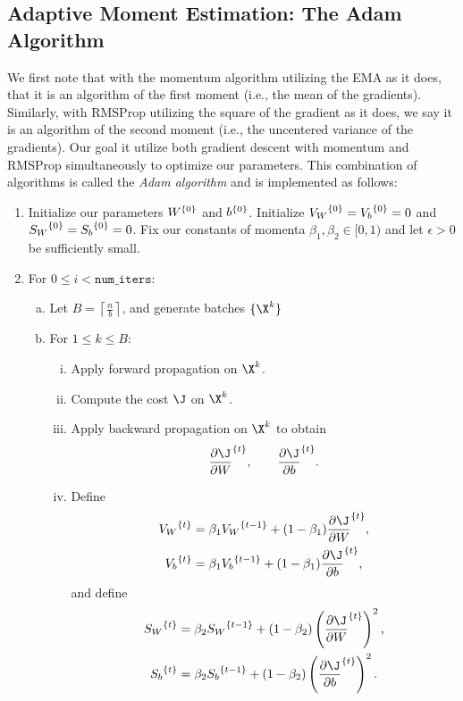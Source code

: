 \subsection{Adaptive Moment Estimation: The Adam Algorithm}

We first note that with the momentum algorithm utilizing the EMA as it does, that it is an algorithm of the first moment (i.e., the mean of the gradients).  Similarly, with RMSProp utilizing the square of the gradient as it does, we say it is an algorithm of the second moment (i.e., the uncentered variance of the gradients).  Our goal it utilize both gradient descent with momentum and RMSProp simultaneously to optimize our parameters.  This combination of algorithms is called the \textit{Adam algorithm} and is implemented as follows:
\begin{enumerate}
	\item Initialize our parameters ${W}^{\{{0}\}}$ and ${b}^{\{{0}\}}$.  Initialize ${V_W}^{\{{0}\}}={V_b}^{\{{0}\}}=0$ and ${S_W}^{\{{0}\}}={S_b}^{\{{0}\}}=0$.  Fix our constants of momenta $\beta_1,\beta_2\in[0,1)$ and let $\epsilon>0$ be sufficiently small.
	\item For $0\leq i <\texttt{num\_iters}$:
	\begin{enumerate}[a.]
		\item Let $B=\left\lceil\frac{n}{b}\right\rceil$, and generate batches $\{\X^k\}$
		\item For $1\leq k\leq B$:
		\begin{enumerate}[i.]
			\item Apply forward propagation on $\X^k$.
			\item Compute the cost $\J$ on $\X^k$.
			\item Apply backward propagation on $\X^k$ to obtain
			$$\iter{\frac{\partial\J}{\partial W}}{t},\qquad \iter{\frac{\partial\J}{\partial b}}{t}.$$
			\item Define
			\begin{align*}
				\iter{V_W}{t}&=\beta_1\iter{V_W}{t-1}+(1-\beta_1)\iter{\frac{\partial\J}{\partial W}}{t},\\
				\iter{V_b}{t}&=\beta_1\iter{V_b}{t-1}+(1-\beta_1)\iter{\frac{\partial\J}{\partial b}}{t},
			\end{align*}
			and define
			\begin{align*}
				\iter{S_W}{t}&=\beta_2\iter{S_W}{t-1}+(1-\beta_2)\left(\iter{\frac{\partial\J}{\partial W}}{t}\right)^2,\\
				\iter{S_b}{t}&=\beta_2\iter{S_b}{t-1}+(1-\beta_2)\left(\iter{\frac{\partial\J}{\partial b}}{t}\right)^2.

\end{align*}
\end{enumerate}
\end{enumerate}
\end{enumerate}
